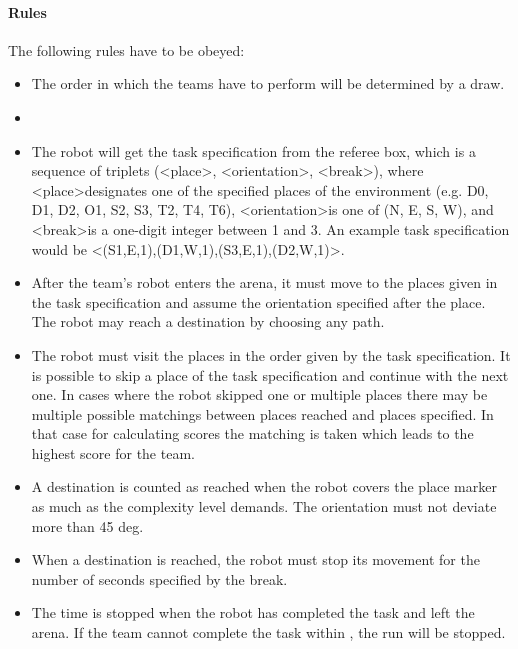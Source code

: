 \paragraph{Rules}
The following rules have to be obeyed:

\begin{itemize}
\item The order in which the teams have to perform will be determined by a draw.
\item {} 
\item The robot will get the task specification from the referee box, which is a sequence of triplets (\textless place\textgreater, \textless orientation\textgreater, \textless break\textgreater), where \textless place\textgreater designates one of the specified places of the environment (e.g. D0, D1, D2, O1, S2, S3, T2, T4, T6), \textless orientation\textgreater is one of (N, E, S, W), and \textless break\textgreater is a one-digit integer between 1 and 3. An example task specification would be \textless (S1,E,1),(D1,W,1),(S3,E,1),(D2,W,1)\textgreater .
\item After the team's robot enters the arena, it must move to the places given in the task specification and assume the orientation specified after the place. The robot may reach a destination by choosing any path.
\item The robot must visit the places in the order given by the task specification. It is possible to skip a place of the task specification and continue with the next one. In cases where the robot skipped one or multiple places there may be multiple possible matchings between places reached and places specified. In that case for calculating scores the matching is taken which leads to the highest score for the team.
\item A destination is counted as reached when the robot covers the place marker as much as the complexity level demands. The orientation must not deviate more than 45 deg.
\item When a destination is reached, the robot must stop its movement for the number of seconds specified by the break.
\item The time is stopped when the robot has completed the task and left the arena. If the team cannot complete the task within , the run will be stopped.
\end{itemize}
